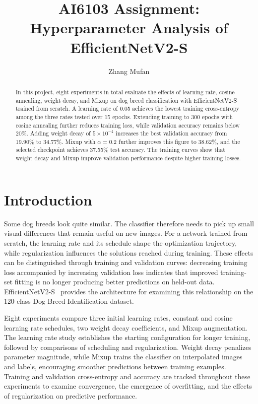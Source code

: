 \documentclass[letterpaper]{article}
\title{AI6103 Assignment: Hyperparameter Analysis of EfficientNetV2-S}
\author{Zhang Mufan}
\begin{document}
\maketitle
\raggedbottom
\begin{abstract}
In this project, eight experiments in total evaluate the effects of learning rate, cosine annealing, weight decay, and Mixup on dog breed classification with EfficientNetV2-S trained from scratch. A learning rate of 0.05 achieves the lowest training cross-entropy among the three rates tested over 15 epochs. Extending training to 300 epochs with cosine annealing further reduces training loss, while validation accuracy remains below 20\%. Adding weight decay of \(5 \times 10^{- 4}\) increases the best validation accuracy from 19.90\% to 34.77\%. Mixup with \(\alpha = 0.2\) further improves this figure to 38.62\%, and the selected checkpoint achieves 37.55\% test accuracy. The training curves show that weight decay and Mixup improve validation performance despite higher training losses.
\end{abstract}

\section{Introduction}

Some dog breeds look quite similar. The classifier therefore needs to pick up small visual differences that remain useful on new images. For a network trained from scratch, the learning rate and its schedule shape the optimization trajectory, while regularization influences the solutions reached during training. These effects can be distinguished through training and validation curves: decreasing training loss accompanied by increasing validation loss indicates that improved training-set fitting is no longer producing better predictions on held-out data. EfficientNetV2-S~\citep{tan2021efficientnetv2} provides the architecture for examining this relationship on the 120-class Dog Breed Identification dataset.

Eight experiments compare three initial learning rates, constant and cosine learning rate schedules, two weight decay coefficients, and Mixup augmentation. The learning rate study establishes the starting configuration for longer training, followed by comparisons of scheduling and regularization. Weight decay penalizes parameter magnitude, while Mixup trains the classifier on interpolated images and labels, encouraging smoother predictions between training examples. Training and validation cross-entropy and accuracy are tracked throughout these experiments to examine convergence, the emergence of overfitting, and the effects of regularization on predictive performance.
\end{document}
